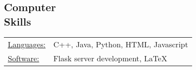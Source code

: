 \documentclass[margin]{res}
\begin{document}
\begin{resume}
\section{Computer \\ Skills}
   \begin{tabular}{l p{3in}}
    \underline{Languages:} & C++, Java, Python, HTML, Javascript \\

     \underline{Software:} & Flask server development, \LaTeX
 \end{tabular}

\end{resume} 
\end{document}
